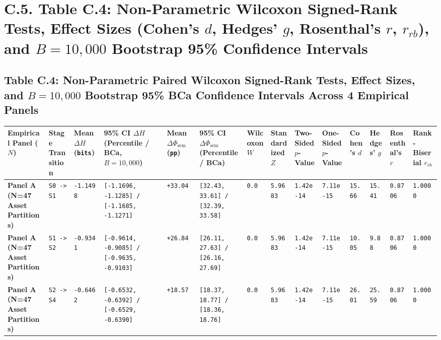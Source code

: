 \documentclass[10pt,a4paper]{article}
\begin{document}
\section*{C.5. Table C.4: Non-Parametric Wilcoxon Signed-Rank Tests, Effect Sizes (Cohen's $d$, Hedges' $g$, Rosenthal's $r$, $r_{rb}$), and $B=10,000$ Bootstrap 95\% Confidence Intervals}

\subsection*{Table C.4: Non-Parametric Paired Wilcoxon Signed-Rank Tests, Effect Sizes, and $B = 10,000$ Bootstrap 95\% BCa Confidence Intervals Across 4 Empirical Panels}

{\scriptsize
\begin{longtable}{p{}p{}p{}p{}p{}p{}p{}p{}p{}p{}p{}p{}p{}p{}}
\toprule
\textbf{Empirical Panel ($N$)} & \textbf{Stage Transition} & \textbf{Mean $\Delta H$ (\texttt{bits})} & \textbf{95\% CI $\Delta H$ (Percentile / BCa, $B=10,000$)} & \textbf{Mean $\Delta \Phi_{\text{sem}}$ (\texttt{pp})} & \textbf{95\% CI $\Delta \Phi_{\text{sem}}$ (Percentile / BCa)} & \textbf{Wilcoxon $W$} & \textbf{Standardized $Z$} & \textbf{Two-Sided $p$-Value} & \textbf{One-Sided $p$-Value} & \textbf{Cohen's $d$} & \textbf{Hedges' $g$} & \textbf{Rosenthal's $r$} & \textbf{Rank-Biserial $r_{rb}$} \\
\midrule
\endhead
\textbf{Panel A (N=47 Asset Partitions)} & \texttt{S0 -> S1} & \texttt{-1.1498} & \texttt{[-1.1696, -1.1285] / [-1.1685, -1.1271]} & \texttt{+33.04} & \texttt{[32.43, 33.61] / [32.39, 33.58]} & \texttt{0.0} & \texttt{5.9683} & \texttt{1.42e-14} & \texttt{7.11e-15} & \texttt{15.66} & \texttt{15.41} & \texttt{0.8706} & \texttt{1.0000} \\
\textbf{Panel A (N=47 Asset Partitions)} & \texttt{S1 -> S2} & \texttt{-0.9341} & \texttt{[-0.9614, -0.9085] / [-0.9635, -0.9103]} & \texttt{+26.84} & \texttt{[26.11, 27.63] / [26.16, 27.69]} & \texttt{0.0} & \texttt{5.9683} & \texttt{1.42e-14} & \texttt{7.11e-15} & \texttt{10.05} & \texttt{9.88} & \texttt{0.8706} & \texttt{1.0000} \\
\textbf{Panel A (N=47 Asset Partitions)} & \texttt{S2 -> S4} & \texttt{-0.6462} & \texttt{[-0.6532, -0.6392] / [-0.6529, -0.6390]} & \texttt{+18.57} & \texttt{[18.37, 18.77] / [18.36, 18.76]} & \texttt{0.0} & \texttt{5.9683} & \texttt{1.42e-14} & \texttt{7.11e-15} & \texttt{26.01} & \texttt{25.59} & \texttt{0.8706} & \texttt{1.0000} \\

\end{longtable}}
\end{document}
